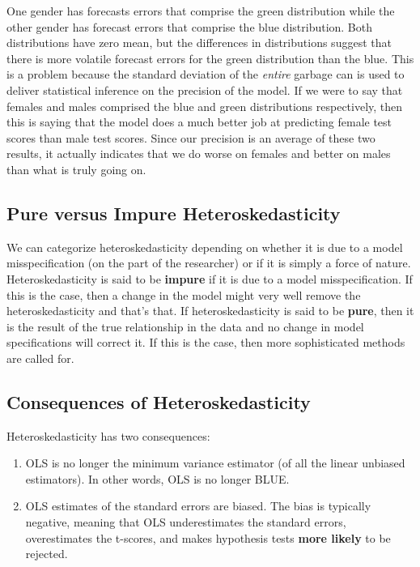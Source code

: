 \documentclass[
]{book}
\begin{document}
One gender has forecasts errors that comprise the green distribution while the other gender has forecast errors that comprise the blue distribution. Both distributions have zero mean, but the differences in distributions suggest that there is more volatile forecast errors for the green distribution than the blue. This is a problem because the standard deviation of the \emph{entire} garbage can is used to deliver statistical inference on the precision of the model. If we were to say that females and males comprised the blue and green distributions respectively, then this is saying that the model does a much better job at predicting female test scores than male test scores. Since our precision is an average of these two results, it actually indicates that we do worse on females and better on males than what is truly going on.

\hypertarget{pure-versus-impure-heteroskedasticity}{%
\subsection{Pure versus Impure Heteroskedasticity}\label{pure-versus-impure-heteroskedasticity}}

We can categorize heteroskedasticity depending on whether it is due to a model misspecification (on the part of the researcher) or if it is simply a force of nature. Heteroskedasticity is said to be \textbf{impure} if it is due to a model misspecification. If this is the case, then a change in the model might very well remove the heteroskedasticity and that's that. If heteroskedasticity is said to be \textbf{pure}, then it is the result of the true relationship in the data and no change in model specifications will correct it. If this is the case, then more sophisticated methods are called for.

\hypertarget{consequences-of-heteroskedasticity}{%
\subsection{Consequences of Heteroskedasticity}\label{consequences-of-heteroskedasticity}}

Heteroskedasticity has two consequences:

\begin{enumerate}
\def\labelenumi{\arabic{enumi}.}
\item
  OLS is no longer the minimum variance estimator (of all the linear
  unbiased estimators). In other words, OLS is no longer BLUE.
\item
  OLS estimates of the standard errors are biased. The bias is typically negative, meaning that OLS underestimates the standard errors, overestimates the t-scores, and makes hypothesis tests \textbf{more likely} to be rejected.
\end{enumerate}
\end{document}
